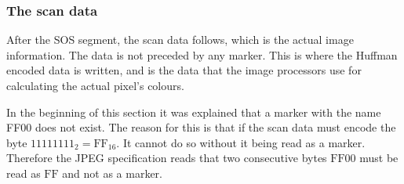 \begin{infobox}
\begin{centering}
\end{centering}

\vspace{4mm}
\subsubsection{The scan data}
\vspace{-2.5mm}
After the SOS segment, the scan data follows, which is the actual image information.
The data is not preceded by any marker.
This is where the Huffman encoded data is written, and is the data that the image processors use for calculating the actual pixel's colours.

In the beginning of this section it was explained that a marker with the name FF00 does not exist.
The reason for this is that if the scan data must encode the byte $1111 1111_2=\text{FF}_{16}$. 
It cannot do so without it being read as a marker.
Therefore the JPEG specification reads that two consecutive bytes $\text{FF}00$ must be read as $\text{FF}$ and not as a marker. 

\end{infobox}